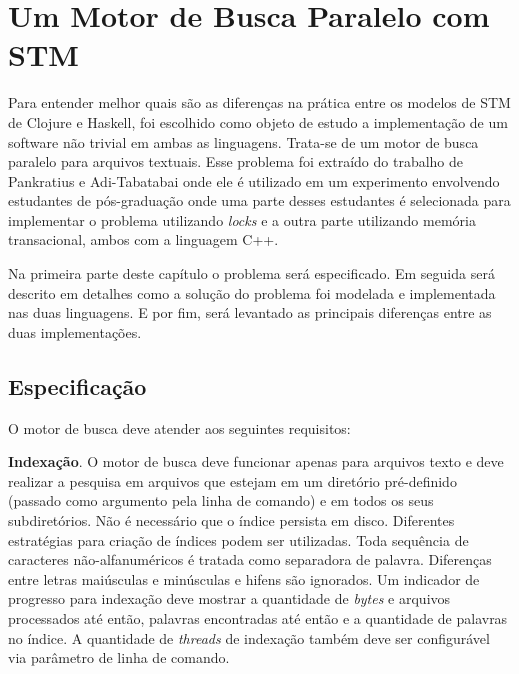 \chapter{Um Motor de Busca Paralelo com STM}

\newcommand{\bigO}[1]{\ensuremath{\operatorname{O}\bigl(#1\bigr)}}

Para entender melhor quais são as diferenças na prática entre os modelos de STM de Clojure e Haskell, foi escolhido como objeto de estudo a implementação de um software não trivial em ambas as linguagens. Trata-se de um motor de busca paralelo para arquivos textuais. Esse problema foi extraído do trabalho de Pankratius e Adi-Tabatabai \cite{pankratius2011study} onde ele é utilizado em um experimento envolvendo estudantes de pós-graduação onde uma parte desses estudantes é selecionada para implementar o problema utilizando \emph{locks} e a outra parte utilizando memória transacional, ambos com a linguagem C++.

Na primeira parte deste capítulo o problema será especificado. Em seguida será descrito em detalhes como a solução do problema foi modelada e implementada nas duas linguagens. E por fim, será levantado as principais diferenças entre as duas implementações.


\section{Especificação}

O motor de busca deve atender aos seguintes requisitos: \cite{pankratius2011study}

\textbf{Indexação}. O motor de busca deve funcionar apenas para arquivos texto e deve realizar a pesquisa em arquivos que estejam em um diretório pré-definido (passado como argumento pela linha de comando) e em todos os seus subdiretórios. Não é necessário que o índice persista em disco. Diferentes estratégias para criação de índices podem ser utilizadas. Toda sequência de caracteres não-alfanuméricos é tratada como separadora de palavra. Diferenças entre letras maiúsculas e minúsculas e hifens são ignorados. Um indicador de progresso para indexação deve mostrar a quantidade de \emph{bytes} e arquivos processados até então, palavras encontradas até então e a quantidade de palavras no índice. A quantidade de \emph{threads} de indexação também deve ser configurável via parâmetro de linha de comando.

